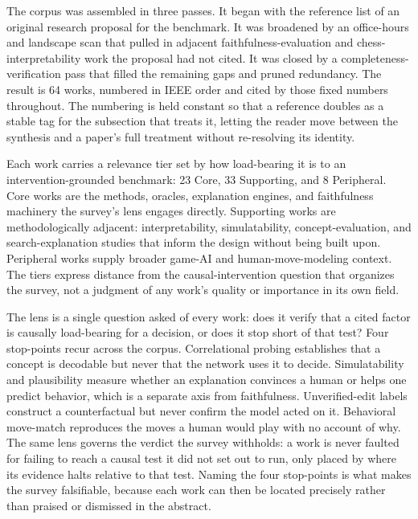 \documentclass[conference]{IEEEtran}
\begin{document}
The corpus was assembled in three passes. It began with the reference list of an original research proposal for the benchmark. It was broadened by an office-hours and landscape scan that pulled in adjacent faithfulness-evaluation and chess-interpretability work the proposal had not cited. It was closed by a completeness-verification pass that filled the remaining gaps and pruned redundancy. The result is 64 works, numbered \cite{ref1,ref2,ref3,ref4,ref5,ref6,ref7,ref8,ref9,ref10,ref11,ref12,ref13,ref14,ref15,ref16,ref17,ref18,ref19,ref20,ref21,ref22,ref23,ref24,ref25,ref26,ref27,ref28,ref29,ref30,ref31,ref32,ref33,ref34,ref35,ref36,ref37,ref38,ref39,ref40,ref41,ref42,ref43,ref44,ref45,ref46,ref47,ref48,ref49,ref50,ref51,ref52,ref53,ref54,ref55,ref56,ref57,ref58,ref59,ref60,ref61,ref62,ref63,ref64} in IEEE order and cited by those fixed numbers throughout. The numbering is held constant so that a reference doubles as a stable tag for the subsection that treats it, letting the reader move between the synthesis and a paper's full treatment without re-resolving its identity.

Each work carries a relevance tier set by how load-bearing it is to an intervention-grounded benchmark: 23 Core, 33 Supporting, and 8 Peripheral. Core works are the methods, oracles, explanation engines, and faithfulness machinery the survey's lens engages directly. Supporting works are methodologically adjacent: interpretability, simulatability, concept-evaluation, and search-explanation studies that inform the design without being built upon. Peripheral works supply broader game-AI and human-move-modeling context. The tiers express distance from the causal-intervention question that organizes the survey, not a judgment of any work's quality or importance in its own field.

The lens is a single question asked of every work: does it verify that a cited factor is causally load-bearing for a decision, or does it stop short of that test? Four stop-points recur across the corpus. Correlational probing establishes that a concept is decodable but never that the network uses it to decide. Simulatability and plausibility measure whether an explanation convinces a human or helps one predict behavior, which is a separate axis from faithfulness. Unverified-edit labels construct a counterfactual but never confirm the model acted on it. Behavioral move-match reproduces the moves a human would play with no account of why. The same lens governs the verdict the survey withholds: a work is never faulted for failing to reach a causal test it did not set out to run, only placed by where its evidence halts relative to that test. Naming the four stop-points is what makes the survey falsifiable, because each work can then be located precisely rather than praised or dismissed in the abstract.
\end{document}
